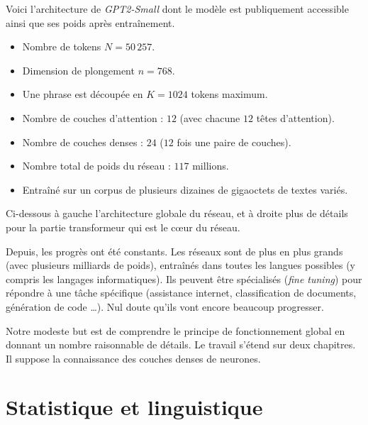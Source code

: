 \documentclass[11pt,class=report,crop=false]{standalone}
\begin{document}
Voici l'architecture de \emph{GPT2-Small} dont le modèle est publiquement accessible ainsi que ses poids après entraînement.

\begin{itemize}
	\item Nombre de tokens $N = 50\,257$.
	\item Dimension de plongement $n=768$.
	\item Une phrase est découpée en $K = 1024$ tokens maximum.
	\item Nombre de couches d'attention : $12$ (avec chacune $12$ têtes d'attention).
	\item Nombre de couches denses : $24$ ($12$ fois une paire de couches).
	\item Nombre total de poids du réseau : $117$ millions.
	\item Entraîné sur un corpus de plusieurs dizaines de gigaoctets de textes variés.
\end{itemize}

Ci-dessous à gauche l'architecture globale du réseau, et à droite plus de détails pour la partie \og{}transformeur\fg{} qui est le c\oe ur du réseau.

\begin{center}
\begin{minipage}{0.49\textwidth}
\small	
{}
\end{minipage}
\begin{minipage}{0.49\textwidth}
		
\end{minipage}
\end{center}


Depuis, les progrès ont été constants. Les réseaux sont de plus en plus grands (avec plusieurs milliards de poids), entraînés dans toutes les langues possibles (y compris les langages informatiques). Ils peuvent être spécialisés (\emph{fine tuning}) pour répondre à une tâche spécifique (assistance internet, classification de documents, génération de code \Python\ldots). Nul doute qu'ils vont encore beaucoup progresser.

Notre modeste but est de comprendre le principe de fonctionnement global en donnant un nombre raisonnable de détails. Le travail s'étend sur deux chapitres. Il suppose la connaissance des couches denses de neurones.


\section{Statistique et linguistique}
\end{document}
